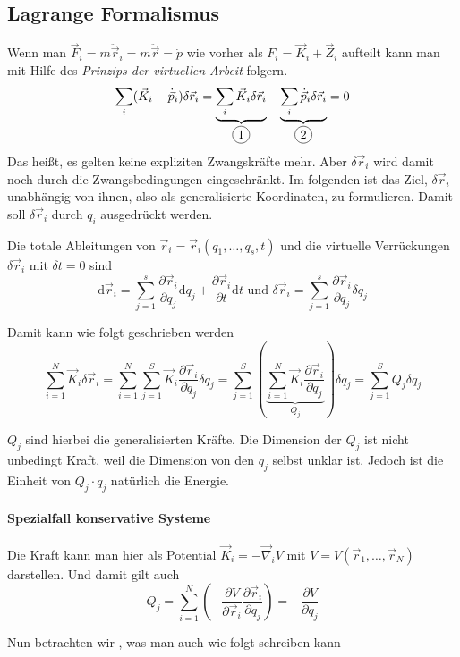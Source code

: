 \documentclass[oneside]{book}
\theoremstyle{definition}
\newcommand{\circled}[1]{\tikz[baseline=(char.base)]{
		\node[shape=circle,draw,inner sep=2pt] (char) {#1};}}
\renewcommand{\d}{\mathrm d}
\newcommand{\ddv}[1]{\ddot{\vec{#1}}}
\newcommand{\ffpartial}[2]{\frac{\partial #1}{\partial #2}}
\newcommand{\ddotvec}[1]{\ddot{\vec{#1}}}
\begin{document}
\subsection{Lagrange Formalismus}
Wenn man $\vec{F}_i = m \ddotvec{r}_i = m \ddv{r} = \dot p$ wie vorher als $F_i = \vec{K}_i + \vec{Z}_i$ aufteilt kann man mit Hilfe des \textit{Prinzips der virtuellen Arbeit} folgern.
$$\sum_i (\vec{K}_i - \dot{\vec{p}}_i) \delta \vec{r}_i = \underbrace{\sum_i \vec{K}_i \delta\vec{r}_i}_{\circled{1}} - \underbrace{\sum_i \dot{\vec{p}}_i \delta\vec{r}_i}_{\circled{2}} = 0$$
Das heißt, es gelten keine expliziten Zwangskräfte mehr.
Aber $\delta \vec{r}_i$ wird damit noch durch die Zwangsbedingungen eingeschränkt. Im folgenden ist das Ziel, $\delta \vec{r}_i$ unabhängig von ihnen, also als generalisierte Koordinaten, zu formulieren. Damit soll $\delta \vec{r}_i$ durch $q_i$ ausgedrückt werden.

Die totale Ableitungen von $\vec{r}_i = \vec{r}_i(q_1, \dots, q_s, t)$ und die virtuelle Verrückungen $\delta \vec{r}_i$ mit $\delta t = 0$ sind
$$\d \vec{r}_i = \sum_{j = 1}^{s} \frac{\partial \vec{r}_i}{\partial q_j} \d q_j + \frac{\partial \vec{r}_i}{\partial t} \d t \text{~und~} \delta \vec{r}_i = \sum_{j = 1}^s \frac{\partial \vec{r}_i}{\partial q_j} \delta q_j$$

Damit kann \circled{1}  wie folgt geschrieben werden
$$\sum_{i = 1}^N \vec{K}_i \delta \vec{r}_i 
= \sum_{i=1}^N \sum_{j = 1}^S \vec{K}_i \frac{\partial \vec{r}_i}{\partial q_j} \delta q_j
= \sum_{j=1}^S \left( \underbrace{\sum_{i = 1}^N \vec{K}_i \frac{\partial \vec{r}_i}{\partial q_j}}_{Q_j} \right) \delta q_j
= \sum_{j = 1}^S Q_j \delta q_j$$

$Q_j$ sind hierbei die generalisierten Kräfte. Die Dimension der $Q_j$ ist nicht unbedingt Kraft, weil die Dimension von den $q_j$ selbst unklar ist. Jedoch ist die Einheit von $Q_j \cdot q_j$ natürlich die Energie.

\paragraph{Spezialfall konservative Systeme}
Die Kraft kann man hier als Potential $\vec{K}_i = - \vec\nabla_i V$ mit $V = V(\vec{r}_1, \dots, \vec{r}_N)$ darstellen. Und damit gilt auch
$$Q_j = \sum_{i = 1}^N (- \frac{\partial V}{\partial \vec{r}_i} \ffpartial{\vec{r}_i}{q_j}) = - \ffpartial{V}{q_j}$$

Nun betrachten wir \circled{2}, was man auch wie folgt schreiben kann
\end{document}
